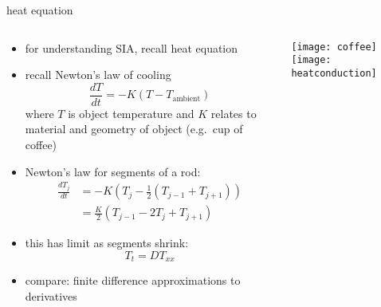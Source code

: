 \begin{frame}{heat equation}
\label{slide:heatcompare}

\small
\begin{columns}
\begin{column}{0.6\textwidth}
\begin{itemize}
\item for understanding SIA, recall heat equation
\item recall Newton's law of cooling
	$$\frac{dT}{dt} = -K (T-T_{\text{ambient}})$$
where $T$ is object temperature and $K$ relates to material and geometry of object (e.g.~cup of coffee)
\item Newton's law for segments of a rod:
\begin{align*}
\frac{dT_j}{dt} &= -K \left(T_j - \frac{1}{2} (T_{j-1} + T_{j+1}) \right) \\
	&= \frac{K}{2} \left(T_{j-1} - 2 T_j + T_{j+1}\right) 
\end{align*}
\item this has limit as segments shrink:
	$$T_t = D T_{xx}$$
\item compare: finite difference approximations to derivatives
\end{itemize}
\end{column}

\begin{column}{0.4\textwidth}
\hfill
\texttt{[image: coffee]}
\vspace{1.0in}
\texttt{[image: heatconduction]}
\end{column}
\end{columns}
\end{frame}

